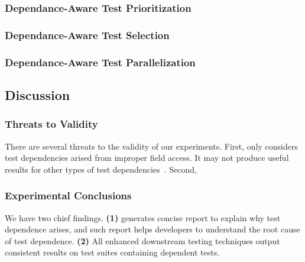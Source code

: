 \subsubsection{Dependance-Aware Test Prioritization}

\subsubsection{Dependance-Aware Test Selection}

\subsubsection{Dependance-Aware Test Parallelization}


\subsection{Discussion}

\subsubsection{Threats to Validity}

There are several threats to the validity
of our experiments. First, \dtexplain 
only considers test dependencies arised
from improper field access. It may not
produce useful results for other types of
test dependencies~\cite{}. Second,

\subsubsection{Experimental Conclusions}

We have two chief findings. \textbf{(1)} \dtexplain
generates concise report to explain why
test dependence arises, and such report
helps developers to understand the root cause
of test dependence. \textbf{(2)} All
enhanced downstream testing techniques
output consistent results on test suites
containing dependent tests.
